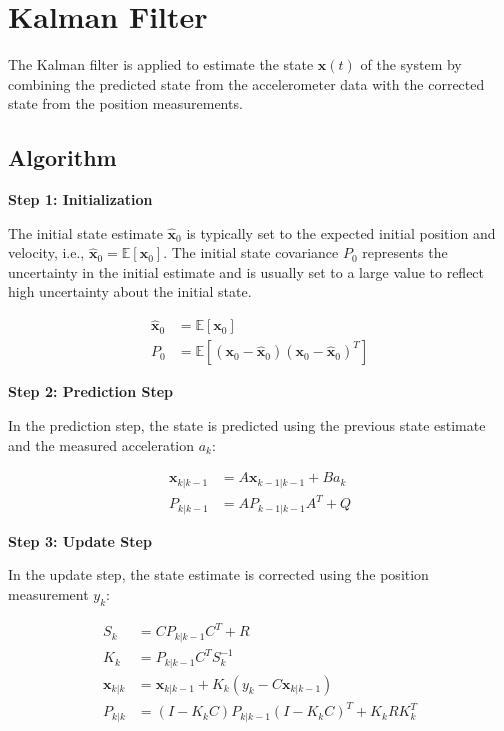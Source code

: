 \section{Kalman Filter}

The Kalman filter is applied to estimate the state \( \mathbf{x}(t) \) 
of the system by combining the predicted state from the accelerometer data
with the corrected state from the position measurements.

\subsection{Algorithm}

\textbf{Step 1: Initialization}

The initial state estimate \( \hat{\mathbf{x}}_0 \) is typically set to the expected 
initial position and velocity, i.e., \( \hat{\mathbf{x}}_0 = \mathbb{E}[\mathbf{x}_0] \). 
The initial state covariance \( P_0 \) represents the uncertainty in the initial estimate 
and is usually set to a large value to reflect high uncertainty about the initial state.

\begin{align}
    \hat{\mathbf{x}}_0 &= \mathbb{E}[\mathbf{x}_0] \\
    P_0 &= \mathbb{E}[(\mathbf{x}_0 - \hat{\mathbf{x}}_0)(\mathbf{x}_0 - \hat{\mathbf{x}}_0)^T]
\end{align}

\textbf{Step 2: Prediction Step}

In the prediction step, the state is predicted using the previous state 
estimate and the measured acceleration \( a_k \):

\begin{align}
    \mathbf{x}_{k|k-1} &= A \mathbf{x}_{k-1|k-1} + B a_k \\
    P_{k|k-1} &= A P_{k-1|k-1} A^T + Q
\end{align}

\textbf{Step 3: Update Step}

In the update step, the state estimate is corrected using the position measurement \( y_k \):

\begin{align}
    S_k &= C P_{k|k-1} C^T + R \\
    K_k &= P_{k|k-1} C^T S_k^{-1} \\
    \mathbf{x}_{k|k} &= \mathbf{x}_{k|k-1} + K_k (y_k - C \mathbf{x}_{k|k-1}) \\
    P_{k|k} &= (I - K_k C) P_{k|k-1} (I - K_k C)^T + K_k R K_k^T
\end{align}

